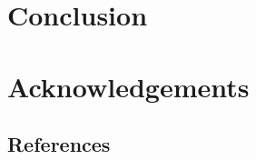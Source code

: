 \documentclass[
]{article}
\begin{document}
\hypertarget{conclusion}{%
\section{Conclusion}\label{conclusion}}

\hypertarget{acknowledgements}{%
\section*{Acknowledgements}\label{acknowledgements}}

\pagebreak

\hypertarget{references}{%
\subsection*{References}\label{references}}
\end{document}
